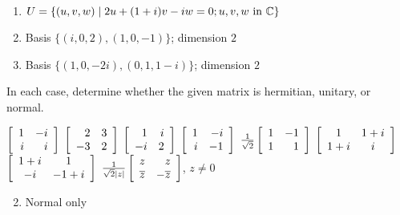 \begin{multicols}{2}
\begin{ex}
\begin{enumerate}[label={\alph*.}]
\item $U = \{(u, v, w) \mid 2u + (1 + i)v - iw = 0;\ \\ u, v, w \mbox{ in } \mathbb{C}\}$

\end{enumerate}
\begin{sol}
\begin{enumerate}[label={\alph*.}]
\setcounter{enumi}{1}
\item  Basis $\{(i, 0, 2), (1, 0, -1)\}$; dimension $2$

\setcounter{enumi}{3}
\item  Basis $\{(1, 0, -2i), (0, 1, 1 - i)\}$; dimension $2$

\end{enumerate}
\end{sol}
\end{ex}

\begin{ex}
In each case, determine whether the given matrix is hermitian, unitary, or normal.

\begin{exenumerate}[column-sep=-15pt]
\exitem $\left[ \begin{array}{rr}
1 & -i \\
i & i
\end{array}\right]$
\exitem $\left[ \begin{array}{rr}
2 & 3 \\
-3 & 2
\end{array}\right]$
\exitem $\left[ \begin{array}{rr}
1 & i \\
-i & 2
\end{array}\right]$
\exitem $\left[ \begin{array}{rr}
1 & -i \\
i & -1
\end{array}\right]$
\exitem $\tfrac{1}{\sqrt{2}} \left[ \begin{array}{rr}
1 & -1 \\
1 & 1
\end{array}\right]$
\exitem $\left[ \begin{array}{cc}
1 & 1 + i \\
1 + i & i
\end{array}\right]$
\exitem $\left[ \begin{array}{cc}
1 + i & 1 \\
-i & -1 + i
\end{array}\right]$
\exitem $\tfrac{1}{\sqrt{2}|z|}\left[ \begin{array}{rr}
z & z \\
\overline{z} & -\overline{z}
\end{array}\right]$, $z \neq 0$
\end{exenumerate}
\begin{sol}
\begin{enumerate}[label={\alph*.}]
\setcounter{enumi}{1}
\item  Normal only


\end{enumerate}
\end{sol}
\end{ex}
\end{multicols}
